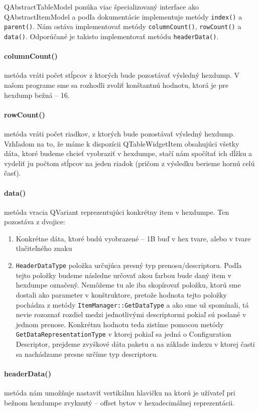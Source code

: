 QAbstractTableModel ponúka viac špecializovaný interface ako QAbstractItemModel a podľa dokumentácie implementuje metódy \texttt{index()} a \texttt{parent()}. Nám ostáva implementovať metódy \texttt{columnCount()}, \texttt{rowCount()} a \texttt{data()}. Odporúčané je takisto implementovať metódu \texttt{headerData()}.

\paragraph{columnCount()} metóda vráti počet stĺpcov z ktorých bude pozostávať výsledný hexdump. V našom programe sme sa rozhodli zvoliť konštantnú hodnotu, ktorá je pre hexdump bežná -- 16.

\paragraph{rowCount()} metóda vráti počet riadkov, z ktorých bude pozostávať výsledný hexdump. Vzhľadom na to, že máme k dispozícii QTableWidgetItem obsahujúci všetky dáta, ktoré budeme chcieť vyobraziť v hexdumpe, stačí nám spočítať ich dĺžku a vydeliť ju počtom stĺpcov na jeden riadok (pričom z výsledku berieme hornú celú časť).

\paragraph{data()} metóda vracia QVariant reprezentujúci konkrétny item v hexdumpe. Ten pozostáva z dvojice:
\begin{enumerate}
\item Konkrétne dáta, ktoré budú vyobrazené -- 1B buď v hex tvare, alebo v tvare tlačiteľného znaku
\item \texttt{HeaderDataType} položka určujúca presný typ prenosu/descriptoru. Podľa tejto položky budeme následne určovať akou farbou bude daný item v hexdumpe označený. Nemôžeme tu ale iba skopírovať položku, ktorú sme dostali ako parameter v konštruktore, pretože hodnota tejto položky pochádza z metódy \texttt{ItemManager::GetDataType} a ako sme už spomínali, tá nevie rozoznať rozdiel medzi jednotlivými descriptormi pokiaľ sú poslané v jednom prenose. Konkrétnu hodnotu teda zistíme pomocou metódy \texttt{GetDataRepresentationType} v ktorej pokiaľ sa jedná o Configuration Descriptor, prejdeme zvyškové dáta paketu a na základe indexu v ktorej časti sa nachádzame presne určíme typ descriptoru.
\end{enumerate}

\paragraph{headerData()} metóda nám umožňuje nastaviť vertikálnu hlavičku na ktorú je užívateľ pri bežnom hexdumpe zvyknutý -- offset bytov v hexadecimálnej reprezentácii.


